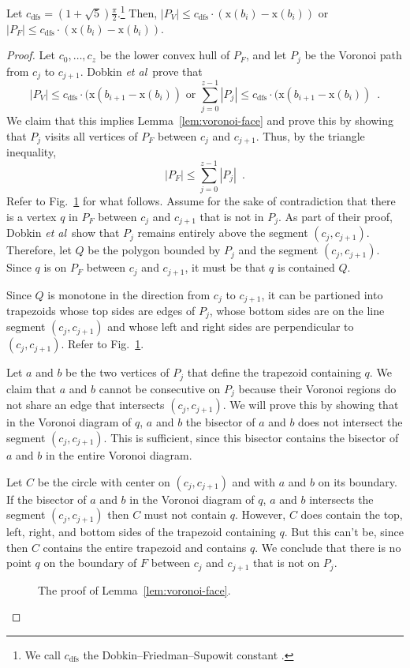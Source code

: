 \documentclass[final]{siamltex}
\newcommand{\centeripe}[1]{\begin{center}\Ipe{#1}\end{center}}
\newcommand{\etal}{{\em et al\/}}
\newcommand{\figlabel}[1]{\label{fig:#1}}
\newcommand{\figref}[1]{\mbox{Fig.~\ref{fig:#1}}}
\newcommand{\lemlabel}[1]{\label{lem:#1}}
\newcommand{\lemref}[1]{Lemma~\ref{lem:#1}}
\newcommand{\x}{\mathrm{x}}
\newcommand{\dconst}{(1+\sqrt{5})\frac{\pi}{2}}
\newcommand{\cdfs}{c_\mathrm{dfs}}
\begin{document}
\begin{lemma}\lemlabel{voronoi-face}
Let $\cdfs=\dconst$.\footnote{We call $\cdfs$ the
Dobkin--Friedman--Supowit constant \cite{dfs87}.}  Then, $|P_V|\le
\cdfs\cdot(\x(b_i)-\x(b_i))$ or $|P_F|\le
\cdfs\cdot(\x(b_i)-\x(b_i))$.
\end{lemma}

\begin{proof}
Let $c_0,\ldots,c_{z}$ be the lower convex hull of $P_F$, and let
$P_j$ be the Voronoi path from $c_j$ to $c_{j+1}$.  Dobkin \etal\
prove that 
\begin{equation}
|P_V|\le\cdfs\cdot(\x(b_{i+1}-\x(b_i))\mbox{ or }
\sum_{j=0}^{z-1}|P_j|\le\cdfs\cdot(\x(b_{i+1}-\x(b_i)) \enspace .
\end{equation}
We claim that this implies \lemref{voronoi-face} and prove this by
showing that $P_j$ visits all vertices of $P_F$ between $c_j$ and
$c_{j+1}$.  Thus, by the triangle inequality, 
\begin{equation}
|P_F|\le \sum_{j=0}^{z-1}|P_j| \enspace .
\end{equation}
Refer to \figref{voro-lem-proof} for what follows.  Assume for the
sake of contradiction that there is a vertex $q$ in $P_F$ between
$c_j$ and $c_{j+1}$ that is not in $P_j$.  As part of their proof,
Dobkin \etal\ show that $P_j$ remains entirely above the segment
$(c_j,c_{j+1})$. Therefore, let $Q$ be the polygon bounded by $P_j$
and the segment $(c_j,c_{j+1})$.  Since $q$ is on $P_F$ between $c_j$
and $c_{j+1}$, it must be that $q$ is contained $Q$.

Since $Q$ is monotone in the direction from $c_j$ to $c_{j+1}$, it can
be partioned into trapezoids whose top sides are edges of $P_j$, whose
bottom sides are on the line segment $(c_j,c_{j+1})$ and whose left
and right sides are perpendicular to $(c_j,c_{j+1})$.  Refer to
\figref{voro-lem-proof}.

Let $a$ and $b$ be the two vertices of $P_j$ that define the trapezoid
containing $q$.  We claim that $a$ and $b$ cannot be consecutive on
$P_j$ because their Voronoi regions do not share an edge that
intersects $(c_j,c_{j+1})$.  We will prove this by showing that in the
Voronoi diagram of $q$, $a$ and $b$ the bisector of $a$ and $b$ does
not intersect the segment $(c_j,c_{j+1})$.  This is sufficient, since
this bisector contains the bisector of $a$ and $b$ in the entire
Voronoi diagram.

Let $C$ be the circle with center on $(c_j,c_{j+1})$ and with $a$ and
$b$ on its boundary.  If the bisector of $a$ and $b$ in the Voronoi
diagram of $q$, $a$ and $b$ intersects the segment $(c_j,c_{j+1})$
then $C$ must not contain $q$.  However, $C$ does contain the top,
left, right, and bottom sides of the trapezoid containing $q$.  But
this can't be, since then $C$ contains the entire trapezoid and
contains $q$. We conclude that there is no point $q$ on the boundary
of $F$ between $c_j$ and $c_{j+1}$ that is not on $P_j$.
\begin{figure}
\centeripe{voro-lem-proof2}
\caption{The proof of \lemref{voronoi-face}.}
\figlabel{voro-lem-proof}
\end{figure}
\qquad
\end{proof}
\end{document}
